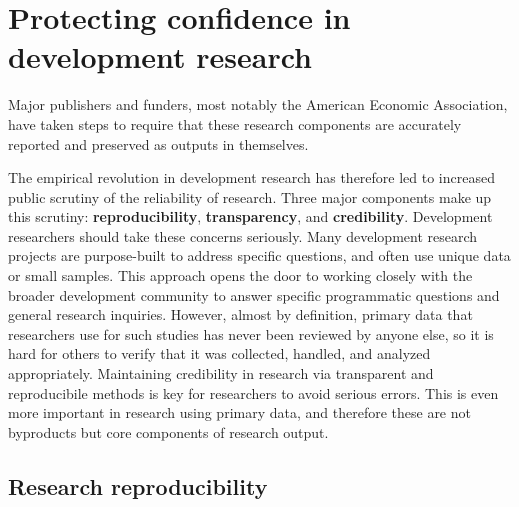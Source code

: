 
\section{Protecting confidence in development research}


Major publishers and funders, most notably the American Economic Association,
have taken steps to require that these research components
are accurately reported and preserved as outputs in themselves.

The empirical revolution in development research
has therefore led to increased public scrutiny of the reliability of research.\cite{rogers_2017}
Three major components make up this scrutiny: \textbf{reproducibility}\cite{duvendack2017meant}, \textbf{transparency},\cite{christensen2018transparency} and \textbf{credibility}.\cite{ioannidis2017power}
Development researchers should take these concerns seriously.
Many development research projects are purpose-built to address specific questions,
and often use unique data or small samples.
This approach opens the door to working closely with the broader development community
to answer specific programmatic questions and general research inquiries.
However, almost by definition,
primary data that researchers use for such studies has never been reviewed by anyone else,
so it is hard for others to verify that it was collected, handled, and analyzed appropriately.
Maintaining credibility in research via transparent and reproducibile methods
is key for researchers to avoid serious errors.
This is even more important in research using primary data,
and therefore these are not byproducts but core components of research output.

\subsection{Research reproducibility}

